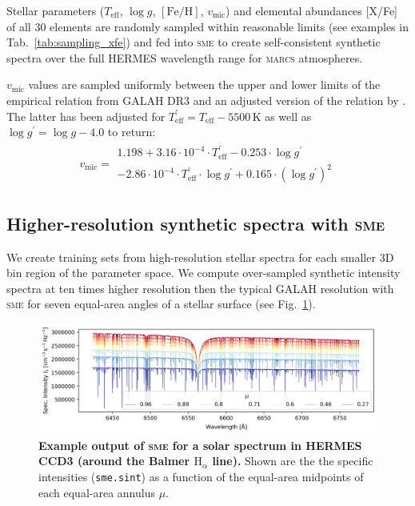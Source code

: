 \documentclass[
  journal=pasa,
  manuscript=research-paper, %
  year=2023,
  volume=37
]{cup-journal}
\newcommand{\Teff}{$T_\mathrm{eff}$\xspace}
\newcommand{\logg}{$\log g$\xspace}
\newcommand{\feh}{$\mathrm{[Fe/H]}$\xspace}
\newcommand{\vmic}{$v_\mathrm{mic}$\xspace}
\newcommand{\sme}{\textsc{sme}\xspace}
\newcommand{\marcs}{\textsc{marcs}\xspace}
\begin{document}
Stellar parameters (\Teff, \logg, \feh, \vmic) and elemental abundances [X/Fe] of all 30 elements are randomly sampled within reasonable limits (see examples in Tab.~\ref{tab:sampling_xfe}) and fed into \sme to create self-consistent synthetic spectra over the full HERMES wavelength range for \marcs atmospheres. 

\vmic values are sampled uniformly between the upper and lower limits of the empirical relation from GALAH DR3 \citep[Eqs.~4 and 5 from][]{Buder2021} and an adjusted version of the relation by \citet{DutraFerreira2016}. The latter has been adjusted for $T_\text{eff}^\prime = T_\text{eff} - 5500\,\mathrm{K}$ as well as $\log g^\prime = \log g - 4.0$ to return:
\begin{align} 
v_\text{mic} = \begin{array}{l}
1.198 + 3.16 \cdot 10^{-4} \cdot T_\text{eff}^\prime - 0.253 \cdot \log g^\prime \\ - 2.86\cdot 10^{-4} \cdot T_\text{eff}^\prime \cdot \log g^\prime + 0.165 \cdot (\log g^\prime)^2
\end{array} \label{eq:vmic_initial}
\end{align}

\subsection{Higher-resolution synthetic spectra with \sme}
\label{sec:higher_resolution_synthetic_spectra}

We create training sets from high-resolution stellar spectra for each smaller 3D bin region of the parameter space. We compute over-sampled synthetic intensity spectra at ten times higher resolution then the typical GALAH resolution with \sme for seven equal-area angles of a stellar surface (see Fig.~\ref{fig:sme_mu_output}).

\begin{figure}[hbt]
 \centering
 \includegraphics[width=\textwidth]{figures/solar_twin_specific_intensity.png}
 \caption{\textbf{Example output of \sme for a solar spectrum in HERMES CCD3 (around the Balmer $\mathrm{H}_\alpha$ line).} Shown are the the specific intensities (\texttt{sme.sint}) as a function of the equal-area midpoints of each equal-area annulus $\mu$.}
 \label{fig:sme_mu_output}
\end{figure}
\end{document}
